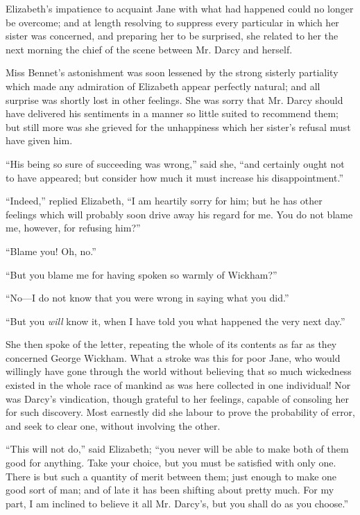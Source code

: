 Elizabeth's impatience to acquaint Jane with what had happened could no longer be overcome; and at length resolving to suppress every particular in which her sister was concerned, and preparing her to be surprised, she related to her the next morning the chief of the scene between Mr. Darcy and herself.

Miss Bennet's astonishment was soon lessened by the strong sisterly partiality which made any admiration of Elizabeth appear perfectly natural; and all surprise was shortly lost in other feelings. She was sorry that Mr. Darcy should have delivered his sentiments in a manner so little suited to recommend them; but still more was she grieved for the unhappiness which her sister's refusal must have given him.

``His being so sure of succeeding was wrong,'' said she, ``and certainly ought not to have appeared; but consider how much it must increase his disappointment.''

``Indeed,'' replied Elizabeth, ``I am heartily sorry for him; but he has other feelings which will probably soon drive away his regard for me. You do not blame me, however, for refusing him?''

``Blame you! Oh, no.''

``But you blame me for having spoken so warmly of Wickham?''

``No---I do not know that you were wrong in saying what you did.''

``But you \textit{will} know it, when I have told you what happened the very next day.''

She then spoke of the letter, repeating the whole of its contents as far as they concerned George Wickham. What a stroke was this for poor Jane, who would willingly have gone through the world without believing that so much wickedness existed in the whole race of mankind as was here collected in one individual! Nor was Darcy's vindication, though grateful to her feelings, capable of consoling her for such discovery. Most earnestly did she labour to prove the probability of error, and seek to clear one, without involving the other.

``This will not do,'' said Elizabeth; ``you never will be able to make both of them good for anything. Take your choice, but you must be satisfied with only one. There is but such a quantity of merit between them; just enough to make one good sort of man; and of late it has been shifting about pretty much. For my part, I am inclined to believe it all Mr. Darcy's, but you shall do as you choose.''

